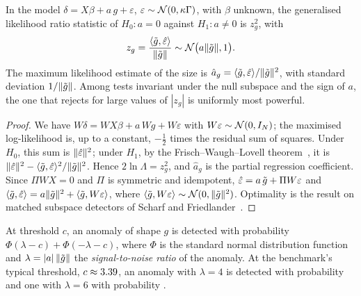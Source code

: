 \begin{theorem}\label{thm-glrt}
In the model $\delta=X\beta+a\,g+\varepsilon$, $\varepsilon\sim\mathcal{N}(0, \kappa\Gamma)$, with $\beta$ unknown, the
generalised likelihood ratio statistic of $H_0:a=0$ against $H_1:a\ne0$ is $z_g^2$, with
\begin{equation}\label{eq-z}
z_g=\frac{\langle \tilde g, \hat\varepsilon\rangle}{\lVert \tilde g\rVert}\sim\mathcal{N}\bigl(a\lVert \tilde g\rVert, 1\bigr).
\end{equation}
The maximum likelihood estimate of the size is $\hat a_g=\langle \tilde g, \hat\varepsilon\rangle/\lVert \tilde g\rVert^2$, with standard deviation
$1/\lVert \tilde g\rVert$. Among tests invariant under the null subspace and the sign of $a$, the one that rejects for large values
of $|z_g|$ is uniformly most powerful.
\end{theorem}
\begin{proof}
We have $W\delta=WX\beta+a\,Wg+W\varepsilon$ with $W\varepsilon\sim\mathcal{N}(0, I_N)$; the maximised log-likelihood is, up to
a constant, $-\tfrac12$ times the residual sum of squares. Under $H_0$, this sum is $\lVert \hat\varepsilon\rVert^2$; under $H_1$, by the
Frisch--Waugh--Lovell theorem~\cite{lovell1963}, it is $\lVert \hat\varepsilon\rVert^2-\langle \tilde g, \hat\varepsilon\rangle^2/\lVert \tilde g\rVert^2$. Hence
$2\ln\Lambda=z_g^2$, and $\hat a_g$ is the partial regression coefficient. Since $\Pi WX=0$ and $\Pi$ is symmetric and
idempotent, $\hat\varepsilon=a\,\tilde g+\Pi W\varepsilon$ and $\langle \tilde g, \hat\varepsilon\rangle=a\lVert \tilde g\rVert^2+\langle \tilde g, W\varepsilon\rangle$, where
$\langle \tilde g, W\varepsilon\rangle\sim\mathcal{N}(0, \lVert \tilde g\rVert^2)$. Optimality is the result on matched subspace detectors of Scharf
and Friedlander~\cite{scharf1994}.
\end{proof}

\begin{corollary}[Power]\label{cor-power}
At threshold $c$, an anomaly of shape $g$ is detected with probability $\Phi(\lambda-c)+\Phi(-\lambda-c)$, where $\Phi$
is the standard normal distribution function and $\lambda=|a|\,\lVert \tilde g\rVert$ the \emph{signal-to-noise ratio} of the
anomaly. At the benchmark's typical threshold, $c\approx\num{3.39}$, an anomaly with $\lambda=4$ is detected with
probability \vPowThFour{} and one with $\lambda=6$ with probability \vPowThSix.
\end{corollary}

